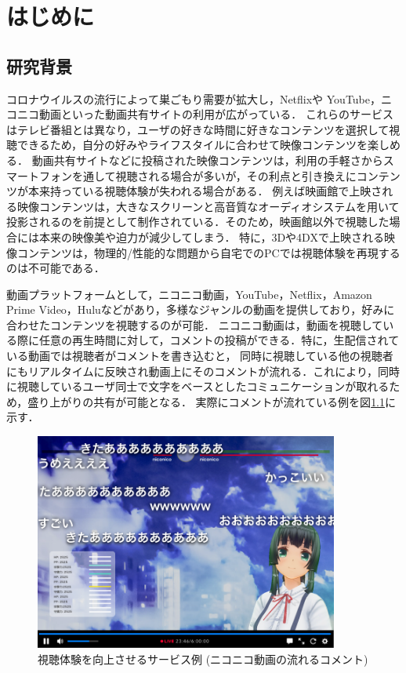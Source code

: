 \chapter{はじめに}
\thispagestyle{myheadings}

\section{研究背景}
コロナウイルスの流行によって巣ごもり需要が拡大し，Netflixや YouTube，ニコニコ動画といった動画共有サイトの利用が広がっている．
これらのサービスはテレビ番組とは異なり，ユーザの好きな時間に好きなコンテンツを選択して視聴できるため，自分の好みやライフスタイルに合わせて映像コンテンツを楽しめる．
動画共有サイトなどに投稿された映像コンテンツは，利用の手軽さからスマートフォンを通して視聴される場合が多いが，その利点と引き換えにコンテンツが本来持っている視聴体験が失われる場合がある．
例えば映画館で上映される映像コンテンツは，大きなスクリーンと高音質なオーディオシステムを用いて投影されるのを前提として制作されている．そのため，映画館以外で視聴した場合には本来の映像美や迫力が減少してしまう．
特に，3Dや4DXで上映される映像コンテンツは，物理的/性能的な問題から自宅でのPCでは視聴体験を再現するのは不可能である．

動画プラットフォームとして，ニコニコ動画，YouTube，Netflix，Amazon Prime Video，Huluなどがあり，多様なジャンルの動画を提供しており，好みに合わせたコンテンツを視聴するのが可能．
ニコニコ動画は，動画を視聴している際に任意の再生時間に対して，コメントの投稿ができる．特に，生配信されている動画では視聴者がコメントを書き込むと，
同時に視聴している他の視聴者にもリアルタイムに反映され動画上にそのコメントが流れる．これにより，同時に視聴しているユーザ同士で文字をベースとしたコミュニケーションが取れるため，盛り上がりの共有が可能となる．
実際にコメントが流れている例を図\ref{nikoniko}に示す．

\begin{figure}[H]
    \centering
    \includegraphics[width=10cm]{images/chapter1/nikoniko_grafu.png}
    \caption{視聴体験を向上させるサービス例 (ニコニコ動画の流れるコメント)}
    \label{nikoniko}
\end{figure}

